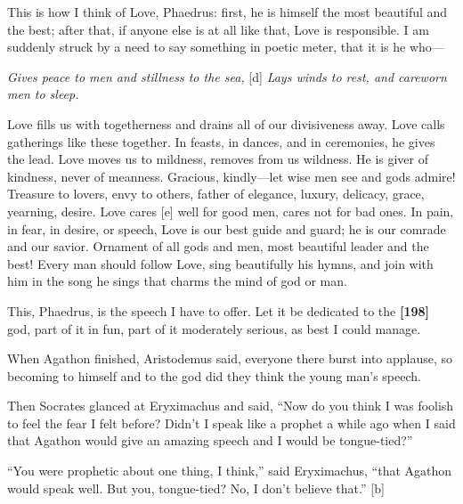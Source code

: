This is how I think of Love, Phaedrus: first, he is himself the most
beautiful and the best; after that, if anyone else is at all like that,
Love is responsible. I am suddenly struck by a need to say something in
poetic meter, that it
is he who---\crlf
\crlf

{\em Gives peace to men and stillness to the sea,}\crlf
{[}d{]} {\em Lays winds to rest, and careworn men to sleep.}\crlf
\crlf

Love fills us with togetherness and drains all of our divisiveness away.
Love calls gatherings like these together. In feasts, in dances, and in
ceremonies, he gives the lead. Love moves us to mildness, removes from
us wildness. He is giver of kindness, never of meanness. Gracious,
kindly---let wise men
see and gods admire! Treasure to lovers, envy to others, father of
elegance, luxury, delicacy, grace, yearning, desire. Love cares {[}e{]}
well for good men, cares not for bad ones. In pain, in fear, in desire,
or speech, Love is our best guide and guard; he is our comrade and our
savior. Ornament of all gods and men, most beautiful leader and the
best! Every man should follow Love, sing beautifully his hymns, and join
with him in the song he sings that charms the mind of god or man.

This, Phaedrus, is the speech I have to offer. Let it be dedicated to
the {\bf {[}198{]}} god, part of it in fun, part of it moderately
serious, as best I could manage.

When Agathon finished, Aristodemus said, everyone there burst into
applause, so becoming to himself and to the god did they think the young
man's speech.

Then Socrates glanced at Eryximachus and said, “Now do you think I was
foolish to feel the fear I felt before? Didn't I speak like a prophet a
while ago when I said that Agathon would give an amazing speech and I
would be tongue-tied?”

“You were prophetic about one thing, I think,” said Eryximachus, “that
Agathon would speak well. But you, tongue-tied? No, I don't believe
that.” {[}b{]}

